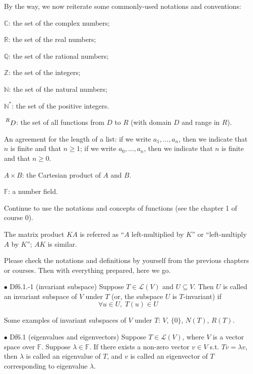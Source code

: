 \documentclass{article}
\begin{document}
By the way, we now reiterate some commonly-used notations and conventions:
\begin{compactenum}
    \item $\mathbb{C}$: the set of the complex numbers;
    \item $\mathbb{R}$: the set of the real numbers;
    \item $\mathbb{Q}$: the set of the rational numbers;
    \item $\mathbb{Z}$: the set of the integers;
    \item $\mathbb{N}$: the set of the natural numbers;
    \item $\mathbb{N^\ast}$: the set of the positive integers.
    \item $\sideset{^R}{}{\mathop{D}}$: the set of all functions from $D$ to $R$ (with domain $D$ and range in $R$).
    \item An agreement for the length of a list: if we write $a_1, \dots, a_n$, then we indicate that $n$ is finite and that $n\geq 1$; if we write $a_0, \dots, a_n$, then we indicate that $n$ is finite and that $n\geq 0$.
    \item $A\times B$: the Cartesian product of $A$ and $B$.
    \item $\mathbb{F}$: a number field.
    \item Continue to use the notations and concepts of functions (see the chapter 1 of course 0).
    \item The matrix product $KA$ is referred as ``$A$ left-multiplied by $K$'' or ``left-multiply $A$ by $K$''; $AK$ is similar.
\end{compactenum} 
Please check the notations and definitions by yourself from the previous chapters or courses. Then with everything prepared, here we go.

\begin{Df}{$\bullet$ Df6.1.-1 (invariant subspace)}
    Suppose $T\in\mathcal{L}(V)$ and $U\subseteq V$. Then $U$ is called an invariant subspace of $V$ under $T$ (or, the subspace $U$ is $T$-invariant) if
    $$\forall u\in U, \;T(u)\in U$$
\end{Df}

\begin{Rmk}{}
    Some examples of invariant subspaces of $V$ under $T$: $V$, $\{0\}$, $N(T)$, $R(T)$.
\end{Rmk}

\begin{Df}{$\bullet$ Df6.1 (eigenvalues and eigenvectors)}
    Suppose $T\in\mathcal{L}(V)$, where $V$ is a vector space over $\mathbb{F}$. Suppose $\lambda\in\mathbb{F}$. If there exists a non-zero vector $v\in V$ s.t. $Tv=\lambda v$, then $\lambda$ is called an eigenvalue of $T$, and $v$ is called an eigenvector of $T$ corresponding to eigenvalue $\lambda$.
\end{Df}
\end{document}
